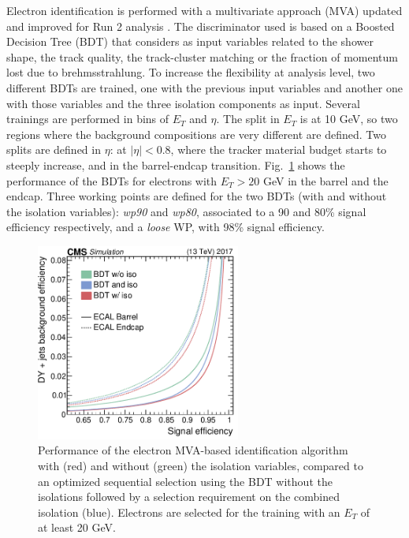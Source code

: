 \documentclass[../main.tex]{subfiles}
\begin{document}
Electron identification is performed with a multivariate approach (MVA) updated and improved for Run 2 analysis \cite{intro:id:ele_mva}. The discriminator used is based on a Boosted Decision Tree (BDT) that considers as input variables related to the shower shape, the track quality, the track-cluster matching or the fraction of momentum lost due to brehmsstrahlung. To increase the flexibility at analysis level, two different BDTs are trained, one with the previous input variables and another one with those variables and the three isolation components as input. Several trainings are performed in bins of $E_T$ and $\eta$. The split in $E_T$ is at 10 GeV, so two regions where the background compositions are very different are defined. Two splits are defined in $\eta$: at $|\eta|<0.8$, where the tracker material budget starts to steeply increase, and in the barrel-endcap transition. Fig.~\ref{intro:fig:ele_mva} shows the performance of the BDTs for electrons with $E_T > 20$ GeV in the barrel and the endcap. Three working points are defined for the two BDTs (with and without the isolation variables): \textit{wp90} and \textit{wp80}, associated to a 90 and 80\% signal efficiency respectively, and a \textit{loose} WP, with 98\% signal efficiency.

\begin{figure}[h!]
\begin{center}
\includegraphics[width=0.6\textwidth]{Images/ele_mva}
\end{center}
\caption{Performance of the electron MVA-based identification algorithm with (red) and without (green) the isolation variables, compared to an optimized sequential selection using the BDT without the isolations followed by a selection requirement on the combined isolation (blue). Electrons are selected for the training with an $E_T$ of at least 20 GeV.}
\label{intro:fig:ele_mva}
\end{figure}
\end{document}
